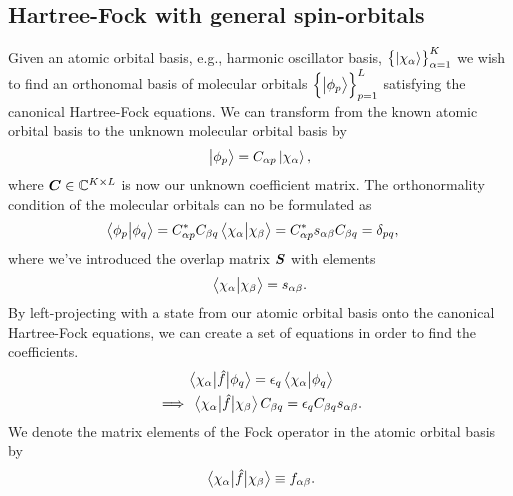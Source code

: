         \subsection{Hartree-Fock with general spin-orbitals}
            Given an atomic orbital basis, e.g., harmonic oscillator basis,
            $\left\{ \ket{\chi_{\alpha}} \right\}_{\alpha = 1}^{K}$ we wish to find an
            orthonomal basis of molecular orbitals $\left\{ \ket{\phi_{p}} \right\}_{p =
            1}^{L}$ satisfying the canonical Hartree-Fock equations.
            We can transform from the known atomic orbital basis to the unknown
            molecular orbital basis by
            \begin{align}
                \ket{\phi_p} = C_{\alpha p}\ket{\chi_{\alpha}},
            \end{align}
            where $\boldsymbol{C} \in \mathbb{C}^{K\times L}$ is now our unknown
            coefficient matrix.
            The orthonormality condition of the molecular orbitals can no be
            formulated as
            \begin{align}
                \braket{\phi_p}{\phi_q}
                &= C^{*}_{\alpha p} C_{\beta q}
                \braket{\chi_{\alpha}}{\chi_{\beta}}
                = C^{*}_{\alpha p} s_{\alpha \beta}
                C_{\beta q}
                = \delta_{pq},
            \end{align}
            where we've introduced the overlap matrix $\boldsymbol{S}$ with
            elements
            \begin{align}
                \braket{\chi_{\alpha}}{\chi_{\beta}} = s_{\alpha\beta}.
            \end{align}
            By left-projecting with a state from our atomic orbital basis onto
            the canonical Hartree-Fock equations, we can create a set of
            equations in order to find the coefficients.
            \begin{gather}
                \mel{\chi_{\alpha}}{\hat{f}}{\phi_q}
                = \epsilon_{q} \braket{\chi_{\alpha}}{\phi_q}
                \\
                \implies
                \mel{\chi_{\alpha}}{\hat{f}}{\chi_{\beta}} C_{\beta q}
                = \epsilon_q C_{\beta q} s_{\alpha \beta}.
            \end{gather}
            We denote the matrix elements of the Fock operator in the atomic
            orbital basis by
            \begin{align}
                \mel{\chi_{\alpha}}{\hat{f}}{\chi_{\beta}}
                \equiv f_{\alpha \beta}.
            \end{align}
